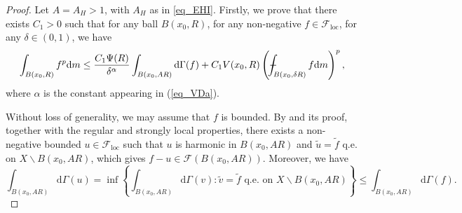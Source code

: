 \documentclass[11pt,a4paper]{article}
\numberwithin{equation}{section}
\def\Xint#1{\mathchoice
{\XXint\displaystyle\textstyle{#1}}%
{\XXint\textstyle\scriptstyle{#1}}%
{\XXint\scriptstyle\scriptscriptstyle{#1}}%
{\XXint\scriptscriptstyle\scriptscriptstyle{#1}}%
\!\int}
\def\XXint#1#2#3{{\setbox0=\hbox{$#1{#2#3}{\int}$ }
\vcenter{\hbox{$#2#3$ }}\kern-.6\wd0}}
\def\dashint{\Xint-}
\theoremstyle{plain}
\theoremstyle{definition}
\begin{document}
\begin{proof}
Let $A=A_H>1$, with $A_H$ as in \ref{eq_EHI}. Firstly, we prove that there exists $C_1>0$ such that for any ball $B(x_0,R)$, for any non-negative $f\in \mathcal{F}_{\mathrm{loc}}$, for any $\delta\in(0,1)$, we have
\begin{equation}\label{eq_weakPI1}
\int_{B(x_0,R)}f^p \mathrm{d}m\le \frac{C_1\Psi(R)}{\delta^\alpha}\int_{B(x_0,AR)}\mathrm{d}\Gamma(f)+C_1V(x_0,R)\left(\dashint_{B(x_0,\delta R)}f \mathrm{d}m\right)^p,
\end{equation}
where $\alpha$ is the constant appearing in (\ref{eq_VDa}).

Without loss of generality, we may assume that $f$ is bounded. By \cite[Proposition 4.2]{Yan25c} and its proof, together with the regular and strongly local properties, there exists a non-negative bounded $u\in \mathcal{F}_{\mathrm{loc}}$ such that $u$ is harmonic in $B(x_0,AR)$ and $\widetilde{u}=\widetilde{f}$ q.e. on $X\backslash B(x_0,AR)$, which gives $f-u\in \mathcal{F}(B(x_0,AR))$. Moreover, we have
\begin{equation}\label{eq_weakPI2}
\int_{B(x_0,AR)}\mathrm{d}\Gamma(u)=\inf \left\{\int_{B(x_0,AR)}\mathrm{d}\Gamma(v):\widetilde{v}=\widetilde{f}\text{ q.e. on }X\backslash B(x_0,AR)\right\}\le \int_{B(x_0,AR)}\mathrm{d}\Gamma(f).
\end{equation}


\end{proof}
\end{document}
